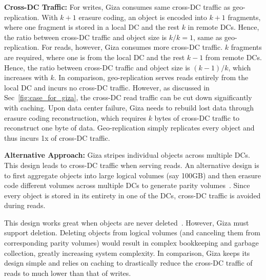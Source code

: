 {\bf Cross-DC Traffic:} For writes, Giza consumes same cross-DC traffic as
geo-replication. With $k+1$ erasure coding, an object is encoded into $k+1$
fragments, where one fragment is stored in a local DC and the rest $k$ in remote
DCs. Hence, the ratio between cross-DC traffic and object size is $k/k = 1$,
same as geo-replication. For reads, however, Giza consumes more cross-DC
traffic. $k$ fragments are required, where one is from the local DC and the rest
$k-1$ from remote DCs. Hence, the ratio between cross-DC traffic and object size
is $(k-1)/k$, which increases with $k$. In comparison, geo-replication serves
reads entirely from the local DC and incurs no cross-DC traffic. However, as
discussed in Sec~\ref{fig:case_for_giza}, the cross-DC read traffic can be cut
down significantly with caching. Upon data center failure, Giza needs to rebuild
lost data through erasure coding reconstruction, which requires $k$ bytes of
cross-DC traffic to reconstruct one byte of data. Geo-replication simply
replicates every object and thus incurs 1x of cross-DC traffic.

{\bf Alternative Approach:} Giza stripes individual objects across multiple DCs. This design leads to cross-DC traffic when serving reads. An alternative design is to first aggregate objects into large logical volumes (say 100GB) and then erasure code different volumes across multiple DCs to generate parity volumes~\cite{f4:osdi14}. Since every object is stored in its entirety in one of the DCs, cross-DC traffic is avoided during reads.

This design works great when objects are never deleted~\cite{f4:osdi14}. However, Giza must support deletion. Deleting objects from logical volumes (and canceling them from corresponding parity volumes) would result in complex bookkeeping and garbage collection, greatly increasing system complexity. In comparison, Giza keeps its design simple and relies on caching to drastically reduce the cross-DC traffic of reads to much lower than that of writes. 

